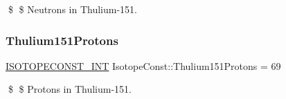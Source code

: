 \$ \$ Neutrons in Thulium-\/151. \mbox{\label{group___isotope_const-_thulium-_tm151_ga1d901b8e360a57dc3a515b695c2a1df1}} 
\subsubsection{\texorpdfstring{Thulium151\+Protons}{Thulium151Protons}}
{\footnotesize\ttfamily \mbox{\hyperlink{group___isotope_const-_macros_ga5f18360b3e99483a35c32d789e62621c}{I\+S\+O\+T\+O\+P\+E\+C\+O\+N\+S\+T\+\_\+\+I\+NT}} Isotope\+Const\+::\+Thulium151\+Protons = 69}

\$ \$ Protons in Thulium-\/151. 